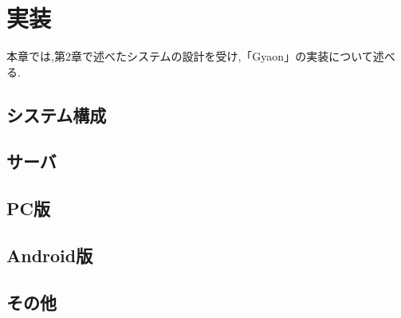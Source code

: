 \chapter{実装}
\label{chap:implementation}

本章では,第2章で述べたシステムの設計を受け,「Gyaon」の実装について述べる.

\newpage

\section{システム構成}

\section{サーバ}

\section{PC版}

\section{Android版}

\section{その他}
